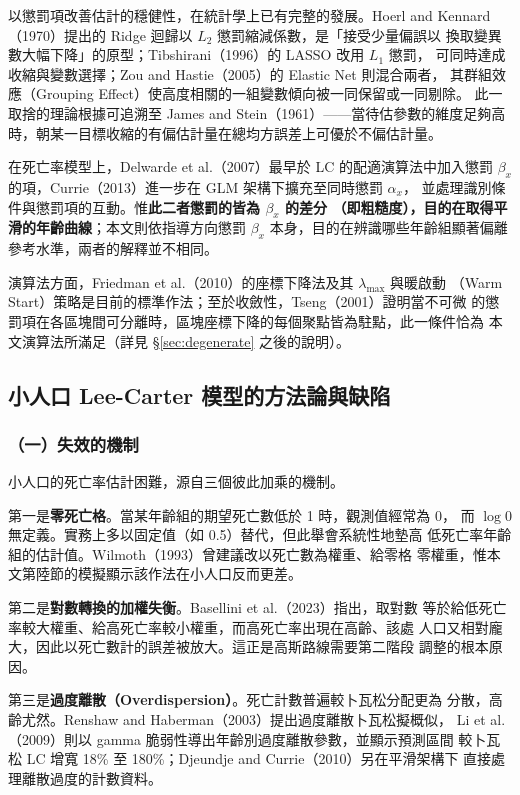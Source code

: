 \documentclass[UTF8, fontset=macnew, a4paper, 12pt]{ctexart}
\begin{document}
以懲罰項改善估計的穩健性，在統計學上已有完整的發展。Hoerl and
Kennard（1970）提出的 Ridge 迴歸以 $L_2$ 懲罰縮減係數，是「接受少量偏誤以
換取變異數大幅下降」的原型；Tibshirani（1996）的 LASSO 改用 $L_1$ 懲罰，
可同時達成收縮與變數選擇；Zou and Hastie（2005）的 Elastic Net 則混合兩者，
其群組效應（Grouping Effect）使高度相關的一組變數傾向被一同保留或一同剔除。
此一取捨的理論根據可追溯至 James and Stein（1961）——當待估參數的維度足夠高
時，朝某一目標收縮的有偏估計量在總均方誤差上可優於不偏估計量。

在死亡率模型上，Delwarde et al.（2007）最早於 LC 的配適演算法中加入懲罰
$\beta_x$ 的項，Currie（2013）進一步在 GLM 架構下擴充至同時懲罰 $\alpha_x$，
並處理識別條件與懲罰項的互動。惟\textbf{此二者懲罰的皆為 $\beta_x$ 的差分
（即粗糙度），目的在取得平滑的年齡曲線}；本文則依指導方向懲罰 $\beta_x$
本身，目的在辨識哪些年齡組顯著偏離參考水準，兩者的解釋並不相同。

演算法方面，Friedman et al.（2010）的座標下降法及其 $\lambda_{\max}$ 與暖啟動
（Warm Start）策略是目前的標準作法；至於收斂性，Tseng（2001）證明當不可微
的懲罰項在各區塊間可分離時，區塊座標下降的每個聚點皆為駐點，此一條件恰為
本文演算法所滿足（詳見 \S\ref{sec:degenerate} 之後的說明）。

\subsection{小人口 Lee-Carter 模型的方法論與缺陷}

\subsubsection{（一）失效的機制}

小人口的死亡率估計困難，源自三個彼此加乘的機制。

第一是\textbf{零死亡格}。當某年齡組的期望死亡數低於 1 時，觀測值經常為 0，
而 $\log 0$ 無定義。實務上多以固定值（如 0.5）替代，但此舉會系統性地墊高
低死亡率年齡組的估計值。Wilmoth（1993）曾建議改以死亡數為權重、給零格
零權重，惟本文第陸節的模擬顯示該作法在小人口反而更差。

第二是\textbf{對數轉換的加權失衡}。Basellini et al.（2023）指出，取對數
等於給低死亡率較大權重、給高死亡率較小權重，而高死亡率出現在高齡、該處
人口又相對龐大，因此以死亡數計的誤差被放大。這正是高斯路線需要第二階段
調整的根本原因。

第三是\textbf{過度離散（Overdispersion）}。死亡計數普遍較卜瓦松分配更為
分散，高齡尤然。Renshaw and Haberman（2003）提出過度離散卜瓦松擬概似，
Li et al.（2009）則以 gamma 脆弱性導出年齡別過度離散參數，並顯示預測區間
較卜瓦松 LC 增寬 18\% 至 180\%；Djeundje and Currie（2010）另在平滑架構下
直接處理離散過度的計數資料。
\end{document}
